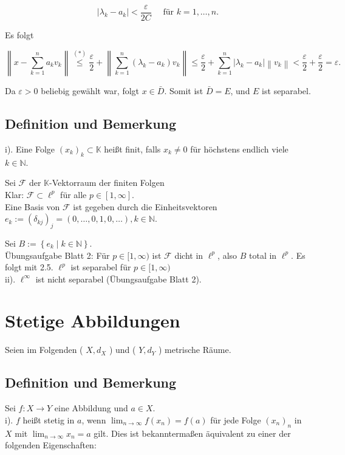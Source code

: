 \documentclass[10pt, letterpaper]{article}
\begin{document}
$$
\left|\lambda_{k}-a_{k}\right|<\frac{\varepsilon}{2 C} \quad \text { für } k=1, \ldots, n .
$$

Es folgt

$$
\left\|x-\sum_{k=1}^{n} a_{k} v_{k}\right\| \stackrel{(*)}{\leq} \frac{\varepsilon}{2}+\left\|\sum_{k=1}^{n}\left(\lambda_{k}-a_{k}\right) v_{k}\right\| \leq \frac{\varepsilon}{2}+\sum_{k=1}^{n}\left|\lambda_{k}-a_{k}\right|\left\|v_{k}\right\|<\frac{\varepsilon}{2}+\frac{\varepsilon}{2}=\varepsilon .
$$

Da $\varepsilon>0$ beliebig gewählt war, folgt $x \in \bar{D}$. Somit ist $\bar{D}=E$, und $E$ ist separabel.

\subsection*{Definition und Bemerkung}
i). Eine Folge $\left(x_{k}\right)_{k} \subset \mathbb{K}$ heißt finit, falls $x_{k} \neq 0$ für höchstens endlich viele $k \in \mathbb{N}$.

Sei $\mathcal{F}$ der $\mathbb{K}$-Vektorraum der finiten Folgen\\
Klar: $\mathcal{F} \subset \ell^{p}$ für alle $p \in[1, \infty]$.\\
Eine Basis von $\mathcal{F}$ ist gegeben durch die Einheitsvektoren $e_{k}:=\left(\delta_{k j}\right)_{j}= (0, \ldots, 0,1,0, \ldots), k \in \mathbb{N}$.

Sei $B:=\left\{e_{k} \mid k \in \mathbb{N}\right\}$.\\
Übungsaufgabe Blatt 2: Für $p \in[1, \infty)$ ist $\mathcal{F}$ dicht in $\ell^{p}$, also $B$ total in $\ell^{p}$. Es folgt mit 2.5. $\ell^{p}$ ist separabel für $p \in[1, \infty)$\\
ii). $\ell^{\infty}$ ist nicht separabel (Übungsaufgabe Blatt 2).

\section*{Stetige Abbildungen}
Seien im Folgenden ( $X, d_{X}$ ) und ( $Y, d_{Y}$ ) metrische Räume.

\subsection*{Definition und Bemerkung}
Sei $f: X \rightarrow Y$ eine Abbildung und $a \in X$.\\
i). $f$ heißt stetig in $a$, wenn $\lim _{n \rightarrow \infty} f\left(x_{n}\right)=f(a)$ für jede Folge $\left(x_{n}\right)_{n}$ in $X$ mit $\lim _{n \rightarrow \infty} x_{n}=a$ gilt. Dies ist bekanntermaßen äquivalent zu einer der folgenden Eigenschaften:
\end{document}
